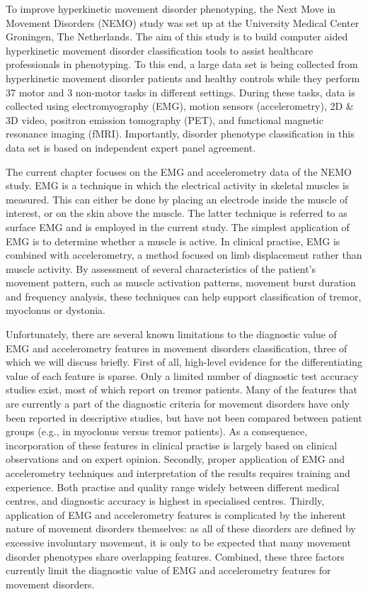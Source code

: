 To improve hyperkinetic movement disorder phenotyping, the Next Move in Movement Disorders (NEMO) study was set up at the University Medical Center Groningen, The Netherlands. The aim of this study is to build computer aided hyperkinetic movement disorder classification tools to assist healthcare professionals in phenotyping. To this end, a large data set is being collected from hyperkinetic movement disorder patients and healthy controls while they perform 37 motor and 3 non-motor tasks in different settings. During these tasks, data is collected using electromyography (EMG), motion sensors (accelerometry), 2D \& 3D video, positron emission tomography (PET), and functional magnetic resonance imaging (fMRI). Importantly, disorder phenotype classification in this data set is based on independent expert panel agreement. 

The current chapter focuses on the EMG and accelerometry data of the NEMO study. EMG is a technique in which the electrical activity in skeletal muscles is measured. This can either be done by placing an electrode inside the muscle of interest, or on the skin above the muscle. The latter technique is referred to as surface EMG and is employed in the current study. The simplest application of EMG is to determine whether a muscle is active. In clinical practise, EMG is combined with accelerometry, a method focused on limb displacement rather than muscle activity. By assessment of several characteristics of the patient’s movement pattern, such as muscle activation patterns, movement burst duration and frequency analysis, these techniques can help support classification of tremor, myoclonus or dystonia.

Unfortunately, there are several known limitations to the diagnostic value of EMG and accelerometry features in movement disorders classification, three of which we will discuss briefly. First of all, high-level evidence for the differentiating value of each feature is sparse. Only a limited number of diagnostic test accuracy studies exist, most of which report on tremor patients. Many of the features that are currently a part of the diagnostic criteria for movement disorders have only been reported in descriptive studies, but have not been compared between patient groups (e.g., in myoclonus versus tremor patients). As a consequence, incorporation of these features in clinical practise is largely based on clinical observations and on expert opinion. Secondly, proper application of EMG and accelerometry techniques and interpretation of the results requires training and experience. Both practise and quality range widely between different medical centres, and diagnostic accuracy is highest in specialised centres. Thirdly, application of EMG and accelerometry features is complicated by the inherent nature of movement disorders themselves: as all of these disorders are defined by excessive involuntary movement, it is only to be expected that many movement disorder phenotypes share overlapping features. Combined, these three factors currently limit the diagnostic value of EMG and accelerometry features for movement disorders.

